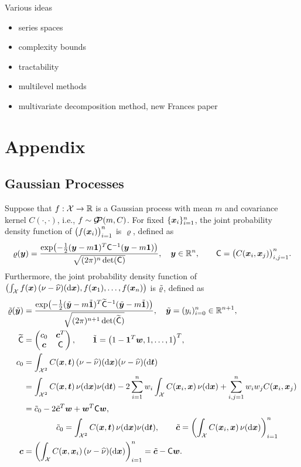\documentclass[graybox,footinfo]{svmult}
\DeclareMathOperator{\GP}{\cg\!\!\cp}
\begin{document}
Various ideas
\begin{itemize}
\item series spaces
\item complexity bounds
\item tractability
\item multilevel methods
\item multivariate decomposition method, new Frances paper
\end{itemize}




\appendix
\section{Appendix}
\subsection{Gaussian Processes}
Suppose that $f:\cx \to \R$ is a Gaussian process with mean $m$ and covariance kernel $C(\cdot,\cdot)$, i.e., $f \sim \GP(m,C)$.  For fixed $\{\bsx_i\}_{i=1}^n$, the joint probability density function of $\bigl(f(\bsx_i)\bigr)_{i=1}^n$ is $\varrho$, defined as 
\begin{equation*}
\varrho (\bsy) = \frac{\exp\bigl(-\frac 12 (\bsy - m \bsone)^T \mC^{-1} (\bsy - m \bsone) \bigr)}{\sqrt{(2 \pi)^n \det(\mC)}}, \quad \bsy \in \R^n, \qquad \mC = \bigl(C(\bsx_i,\bsx_j)\bigr)_{i,j=1}^n.
\end{equation*}
Furthermore, the joint probability density function of $\bigl(\int_{\cx} f(\bsx) \, (\nu -\hnu)(\D \bsx), f(\bsx_1), \ldots, f(\bsx_n)\bigr)$ is $\tvarrho$, defined as 
\begin{align*}
\tvarrho (\tbsy) &= \frac{\exp\bigl(-\frac 12 (\tbsy - m \tbsone)^T \tmC^{-1} (\tbsy - m 
\tbsone) \bigr)}{\sqrt{(2 \pi)^{n+1} \det(\tmC)}}, \quad \tbsy = (y_i)_{i=0}^n \in \R^{n+1}, \\
 \tmC &= \begin{pmatrix} c_0 & \bsc^T \\ \bsc & \mC \end{pmatrix}, \qquad \tbsone = \bigl(1 - \bsone^T\bsw,  1, \ldots, 1 \bigr)^T, \\
 c_0 &= \int_{\cx^2} C(\bsx,\bst) \, (\nu -\hnu)(\D\bsx)(\nu -\hnu)(\D\bst) \\ 
 & = \int_{\cx^2} C(\bsx,\bst) \, \nu (\D\bsx)\nu(\D\bst) - 2 \sum_{i=1}^n w_i \int_{\cx} C(\bsx_i,\bsx) \, \nu (\D\bsx) +  \sum_{i,j=1}^n w_i w_j C(\bsx_i,\bsx_j)\\
 & = \tc_0 -2 \tbsc^T \bsw + \bsw^T \mC \bsw,\\
 & \qquad \qquad   \tc_0 = \int_{\cx^2} C(\bsx,\bst) \, \nu (\D\bsx)\nu(\D\bst), \qquad 
 \tbsc = \biggl( \int_{\cx} C(\bsx_i,\bsx) \, \nu (\D\bsx)\biggr)_{i=1}^n \\
 \bsc &= \biggl( \int_{\cx} C(\bsx,\bsx_i) \, (\nu -\hnu)(\D \bsx)\biggr)_{i=1}^n 
 =  \tbsc - \mC \bsw.
\end{align*}
\end{document}
